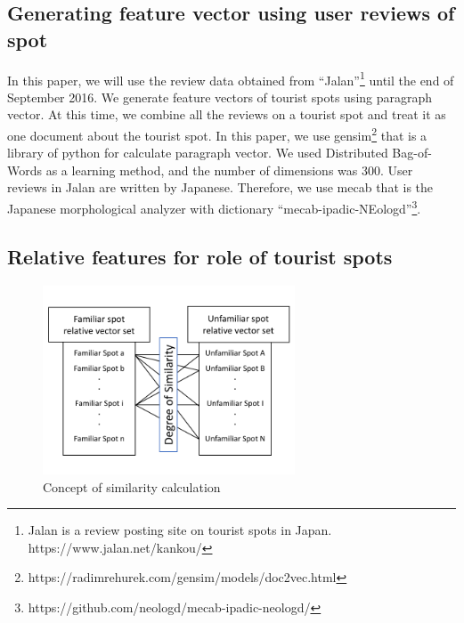 \documentclass[journal]{IAENGtran}
\begin{document}
\subsection{Generating feature vector using user reviews of spot}
\label{subsec:Generating feature vector using user reviews of spot}
In this paper, we will use the review data obtained from ``Jalan''\footnote{Jalan is a review posting site on tourist spots in Japan. https://www.jalan.net/kankou/} until the end of September 2016.
We generate feature vectors of tourist spots using paragraph vector\cite{Codd10}.
At this time, we combine all the reviews on a tourist spot and treat it as one document about the tourist spot.
In this paper, we use gensim\footnote{https://radimrehurek.com/gensim/models/doc2vec.html} that is a library of python for calculate paragraph vector.
We used Distributed Bag-of-Words as a learning method, and the number of dimensions was 300.
User reviews in Jalan are written by Japanese.
Therefore, we use mecab\cite{Codd11} that is the Japanese morphological analyzer with dictionary ``mecab-ipadic-NEologd''\footnote{https://github.com/neologd/mecab-ipadic-neologd/}.

\subsection{Relative features for role of tourist spots}
\label{subsec:Relative features of tourist spots}

\begin{figure}[t]
  \begin{center}
    \includegraphics[clip,width=7.5cm,bb=0 0 720 540]{picture/Photo_CosSim_eng.png}
    \caption{Concept of similarity calculation}
    \label{fig:Photo_CosSim}
    \end{center}
\end{figure}
\end{document}
